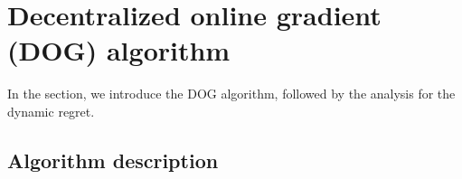 \documentclass{article}
\begin{document}








\section{Decentralized online gradient (DOG) algorithm} \label{sec:algorithm}
In the section, we introduce the DOG algorithm, followed by the analysis for the dynamic regret.
\subsection{Algorithm description}
\end{document}
